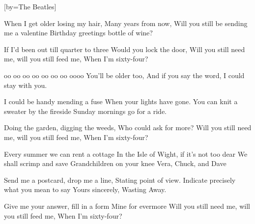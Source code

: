 [by={The Beatles}]

\beginverse
When I get older losing my hair,
Many years from now,
Will you still be sending me a valentine
Birthday greetings bottle of wine?
\endverse

\beginchorus
If I'd been out till quarter to three
Would you lock the door,
Will you still need me, will you still feed me,
When I'm sixty-four?
\endchorus 


\beginverse
oo oo oo oo oo oo oo oooo
You'll be older too, 
And if you say the word,
I could stay with you.
\endverse

\beginverse
I could be handy mending a fuse
When your lights have gone.
You can knit a sweater by the fireside
Sunday mornings go for a ride.
\endverse

\beginchorus
Doing the garden, digging the weeds,
Who could ask for more?
Will you still need me, will you still feed me,
When I'm sixty-four?
\endchorus 

\beginverse
Every summer we can rent a cottage
In the Isle of Wight, if it's not too dear
We shall scrimp and save
Grandchildren on your knee
Vera, Chuck, and Dave
\endverse

\beginverse
Send me a postcard, drop me a line,
Stating point of view.
Indicate precisely what you mean to say
Yours sincerely, Wasting Away.
\endverse

\beginchorus
Give me your answer, fill in a form
Mine for evermore
Will you still need me, will you still feed me,
When I'm sixty-four?
\endchorus
\endsong